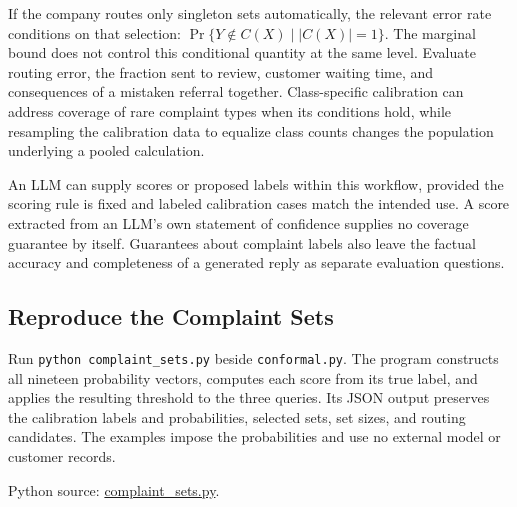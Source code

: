 If the company routes only singleton sets automatically, the relevant
error rate conditions on that selection:
\(\Pr\{Y\notin C(X)\mid |C(X)|=1\}\). The marginal bound does not
control this conditional quantity at the same level. Evaluate routing
error, the fraction sent to review, customer waiting time, and
consequences of a mistaken referral together. Class-specific calibration
can address coverage of rare complaint types when its conditions hold,
while resampling the calibration data to equalize class counts changes
the population underlying a pooled calculation.

An LLM can supply scores or proposed labels within this workflow,
provided the scoring rule is fixed and labeled calibration cases match
the intended use. A score extracted from an LLM's own statement of
confidence supplies no coverage guarantee by itself. Guarantees about
complaint labels also leave the factual accuracy and completeness of a
generated reply as separate evaluation questions.

\FloatBarrier

\hypertarget{M07-reproduce-the-complaint-sets}{%
\subsection{Reproduce the Complaint
Sets}\label{M07-reproduce-the-complaint-sets}}

\noindent \noindent Run \texttt{python\ complaint\_sets.py} beside
\texttt{conformal.py}. The program constructs all nineteen probability
vectors, computes each score from its true label, and applies the
resulting threshold to the three queries. Its JSON output preserves the
calibration labels and probabilities, selected sets, set sizes, and
routing candidates. The examples impose the probabilities and use no
external model or customer records.

\FloatBarrier
{}
Python source:
\href{../03_Data_and_Code/Conformal_Prediction/complaint_sets.py}{complaint\_sets.py}.

